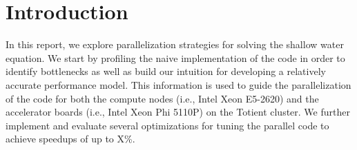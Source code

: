 
\section{Introduction}
\label{sec-intro}

In this report, we explore parallelization strategies for solving the
shallow water equation. We start by profiling the naive implementation of
the code in order to identify bottlenecks as well as build our intuition
for developing a relatively accurate performance model. This information
is used to guide the parallelization of the code for both the compute
nodes (i.e., Intel Xeon E5-2620) and the accelerator boards (i.e., Intel
Xeon Phi 5110P) on the Totient cluster. We further implement and evaluate
several optimizations for tuning the parallel code to achieve speedups of
up to X\%.
